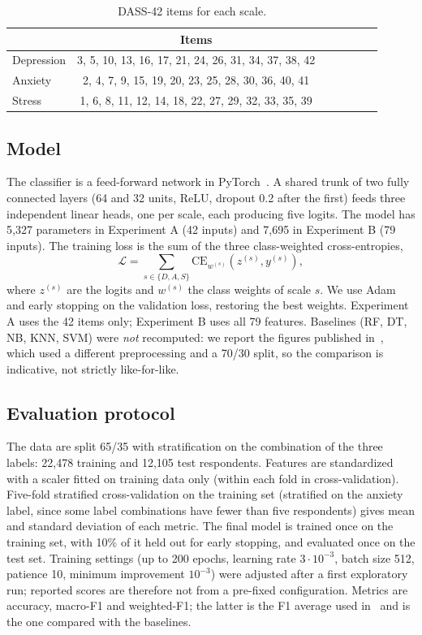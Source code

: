 \documentclass[conference,compsoc]{IEEEtran}
\begin{document}
\begin{table}[!t]
\centering
\caption{DASS-42 items for each scale.}
\label{tab:dass_items}
\begin{tabular}{l cc cc cc}
\hline
 & Items\\
\hline
Depression  & 3, 5, 10, 13, 16, 17, 21, 24, 26, 31, 34, 37, 38, 42\\
Anxiety  & 2, 4, 7, 9, 15, 19, 20, 23, 25, 28, 30, 36, 40, 41\\
Stress  & 1, 6, 8, 11, 12, 14, 18, 22, 27, 29, 32, 33, 35, 39\\
\hline
\end{tabular}
\end{table}

\subsection{Model}
The classifier is a feed-forward network in PyTorch~\cite{torch}.
A shared trunk of two fully connected layers (64 and 32 units, ReLU, dropout 0.2 after the first) feeds three independent linear heads, one per scale, each producing five logits.
The model has 5,327 parameters in Experiment A (42 inputs) and 7,695 in Experiment B (79 inputs).
The training loss is the sum of the three class-weighted cross-entropies,
\begin{equation}
\mathcal{L}=\sum_{s\in\{D,A,S\}}\mathrm{CE}_{w^{(s)}}\!\left(z^{(s)},y^{(s)}\right),
\end{equation}
where $z^{(s)}$ are the logits and $w^{(s)}$ the class weights of scale $s$.
We use Adam~\cite{adam} and early stopping on the validation loss, restoring the best weights.
Experiment A uses the 42 items only; Experiment B uses all 79 features.
Baselines (RF, DT, NB, KNN, SVM) were \emph{not} recomputed: we report the figures published in~\cite{shams}, which used a different preprocessing and a 70/30 split, so the comparison is indicative, not strictly like-for-like.

\subsection{Evaluation protocol}
The data are split 65/35 with stratification on the combination of the three labels: 22,478 training and 12,105 test respondents.
Features are standardized with a scaler fitted on training data only (within each fold in cross-validation).
Five-fold stratified cross-validation on the training set (stratified on the anxiety label, since some label combinations have fewer than five respondents) gives mean and standard deviation of each metric.
The final model is trained once on the training set, with 10\% of it held out for early stopping, and evaluated once on the test set.
Training settings (up to 200 epochs, learning rate $3\cdot10^{-3}$, batch size 512, patience 10, minimum improvement $10^{-3}$) were adjusted after a first exploratory run; reported scores are therefore not from a pre-fixed configuration.
Metrics are accuracy, macro-F1 and weighted-F1; the latter is the F1 average used in~\cite{shams} and is the one compared with the baselines.
\end{document}
